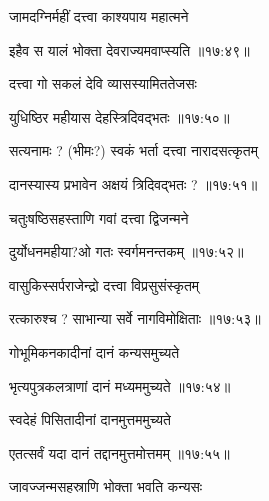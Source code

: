 {\devanagarifontbold जामदग्निर्महीं दत्त्वा काश्यपाय महात्मने \thinspace{\dandab} \dontdisplaylinenum }%
 

{\devanagarifontbold इहैव स यालं भोक्ता देवराज्यमवाप्स्यति {॥१७:४९॥} \veg\dontdisplaylinenum  }%
 
{\devanagarifontbold दत्त्वा गो सकलं देवि व्यासस्यामिततेजसः \thinspace{\dandab} \dontdisplaylinenum }%
 

{\devanagarifontbold युधिष्ठिर महीयास देहस्त्रिदिवद्भतः {॥१७:५०॥} \veg\dontdisplaylinenum }%
 
{\devanagarifontbold सत्यनामः ? (भीमः?) स्वकं भर्ता दत्त्वा नारादसत्कृतम् \thinspace{\dandab} \dontdisplaylinenum }%
 

{\devanagarifontbold दानस्यास्य प्रभावेन अक्षयं त्रिदिवद्भतः ? {॥१७:५१॥} \veg\dontdisplaylinenum }%
 
{\devanagarifontbold चतुःषष्ठिसहस्ताणि गवां दत्त्वा द्विजन्मने \thinspace{\dandab} \dontdisplaylinenum }%
 

{\devanagarifontbold दुर्योधनमहीया?ओ गतः स्वर्गमनन्तकम् {॥१७:५२॥} \veg\dontdisplaylinenum }%
 
{\devanagarifontbold वासुकिस्सर्पराजेन्द्रो दत्त्वा विप्रसुसंस्कृतम् \thinspace{\dandab} \dontdisplaylinenum }%
 

{\devanagarifontbold रत्कारुश्च ? साभान्या सर्वे नागविमोक्षिताः {॥१७:५३॥} \veg\dontdisplaylinenum }%
 
{\devanagarifontbold गोभूमिकनकादीनां दानं कन्यसमुच्यते \thinspace{\dandab} \dontdisplaylinenum }%
 

{\devanagarifontbold भृत्यपुत्रकलत्राणां दानं मध्यममुच्यते {॥१७:५४॥} \veg\dontdisplaylinenum }%
 
{\devanagarifontbold स्वदेहं पिसितादीनां दानमुत्तममुच्यते \thinspace{\dandab} \dontdisplaylinenum }%
 

{\devanagarifontbold एतत्सर्वं यदा दानं तद्दानमुत्तमोत्तमम् {॥१७:५५॥} \veg\dontdisplaylinenum }%

{\devanagarifontbold जावज्जन्मसहस्राणि भोक्ता भवति कन्यसः \thinspace{\dandab} \dontdisplaylinenum }%
 
